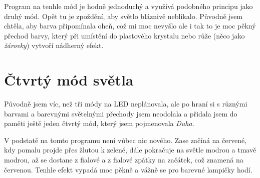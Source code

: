 %


Program na tenhle mód je hodně jednoduchý a využívá podobného principu jako druhý mód. Opět tu je zpoždění, aby světlo bláznivě neblikalo. Původně jsem chtěla, aby barva připomínala oheň, což mi moc nevyšlo ale i tak to je moc pěkný přechod barvy, který při umístění do plastového krystalu nebo růže (něco jako \emph{žárovky}) vytvoří nádherný efekt. 

\section{Čtvrtý mód světla}
Původně jsem víc, než tři módy na LED neplánovala, ale po hraní si s různými barvami a barevnými světelnými přechody jsem neodolala a přidala jsem do paměti ještě jeden čtvrtý mód, který jsem pojmenovala \emph{Duha}.


%



V podstatě na tomto programu není vůbec nic nového. Zase začíná na červené, kdy pomalu projde přes žlutou k zelené, dále pokračuje na světle modrou a tmavě modrou, až se dostane z fialové a z fialové zpátky na začátek, což znamená na červenou. Tenhle efekt vypadá moc pěkně a vážně se pro barevné lampičky hodí. 



\newpage